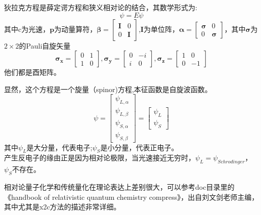 \documentclass[12pt, a4paper, oneside]{ctexart}
\begin{document}
  狄拉克方程是薛定谔方程和狭义相对论的结合，其数学形式为:
\begin{equation}
[c(\bm{\alpha}\cdot\mathbf{c})+m_0c^2\bm{\beta}+V]\psi=E\psi
\end{equation}
其中c为光速，$\bm{p}$为动量算符，$
\bm{\beta}=
\begin{bmatrix}
\bm{I} & 0 \\
0 & \bm{I}
\end{bmatrix}
$,\textbf{I}为单位阵，$
\bm{\alpha} = 
\begin{bmatrix}
\bm{\sigma} & 0 \\
0 & \bm{\sigma}
\end{bmatrix}
$，其中$\bm{\sigma}$为$2\times2$的Pauli自旋矢量
\begin{equation}
\bm{\sigma_x} = 
\begin{bmatrix}
0 & 1 \\
1 & 0
\end{bmatrix},
\bm{\sigma_y} =
\begin{bmatrix}
0 & -i \\
i & 0
\end{bmatrix},
\bm{\sigma_z} =
\begin{bmatrix}
1 & 0 \\
0 & -1
\end{bmatrix}
\end{equation}
他们都是酉矩阵。\par
显然，这个方程是一个旋量（spinor)方程,本征函数是自旋波函数。
\begin{equation}
\psi = 
\begin{bmatrix}
\psi_{L,\alpha} \\
\psi_{L,\beta} \\
\psi_{S,\alpha} \\
\psi_{S,\beta}
\end{bmatrix}
=
\begin{bmatrix}
\psi_{L} \\
\psi_{S}
\end{bmatrix}
\end{equation}
其中$\psi_L$是大分量，代表电子;$\psi_S$是小分量，代表正电子。\\
产生反电子的缘由正是因为相对论极限，当光速接近无穷时，$\psi_L = \psi_{Schrodinger}$，$\psi_S$不存在。\par
相对论量子化学和传统量化在理论表达上差别很大，可以参考doc目录里的《handbook of relativistic quantum chemistry compress》，出自刘文剑老师主编，其中尤其是x2c方法的描述非常详细。
\end{document}
